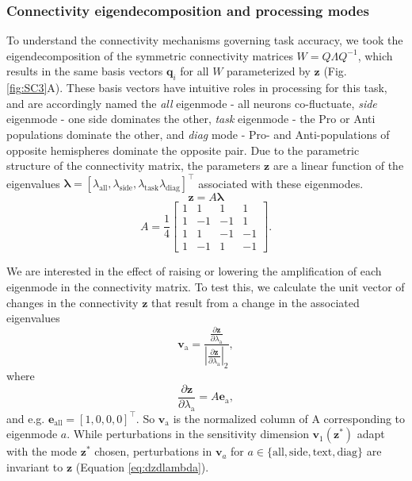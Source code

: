 \documentclass[11pt]{article}
\begin{document}
\subsubsection{Connectivity eigendecomposition and processing modes} \label{methods_sc_eig}
To understand the connectivity mechanisms governing task accuracy, we took the eigendecomposition of the symmetric connectivity matrices $W = Q\Lambda Q^{-1}$, which results in the same basis vectors $\mathbf{q}_i$ for all $W$ parameterized by $\mathbf{z}$ (Fig. \ref{fig:SC3}A). 
These basis vectors have intuitive roles in processing for this task, and are accordingly named the \textit{all} eigenmode - all neurons co-fluctuate, \textit{side} eigenmode - one side dominates the other, \textit{task} eigenmode - the Pro or Anti populations dominate the other, and \textit{diag} mode - Pro- and Anti-populations of opposite hemispheres dominate the opposite pair. 
Due to the parametric structure of the connectivity matrix, the parameters $\mathbf{z}$ are a linear function of the eigenvalues $\bm{\lambda} = [\lambda_{\text{all}}, \lambda_{\text{side}}, \lambda_{\text{task}}\lambda_{\text{diag}}]^\top$ associated with these eigenmodes.
\begin{equation}
\mathbf{z} = A\bm{\lambda}
\end{equation}
\begin{equation}
A = \frac{1}{4} \begin{bmatrix} 1 & 1 & 1 & 1 \\ 1 & -1 & -1 & 1 \\ 1 & 1 & -1 & -1 \\ 1 & -1 & 1 & -1 \end{bmatrix}.
\end{equation}

We are interested in the effect of raising or lowering the amplification of each eigenmode in the connectivity matrix.
To test this, we calculate the unit vector of changes in the connectivity $\mathbf{z}$ that result from a change in the associated eigenvalues
\begin{equation}
\mathbf{v}_{\text{a}} = \frac{\frac{\partial \mathbf{z}}{\partial \lambda_{\text{a}}}}{|\frac{\partial \mathbf{z}}{\partial \lambda_{\text{a}}}|_2},
\end{equation}
where
\begin{equation} \label{eq:dzdlambda}
\frac{\partial \mathbf{z}}{\partial \lambda_{\text{a}}} = A\mathbf{e}_{\text{a}},
\end{equation}
and e.g. $\mathbf{e}_{\text{all}} = [1, 0, 0, 0]^\top$.
So $\mathbf{v}_{\text{a}}$ is the normalized column of A corresponding to eigenmode $a$.
While perturbations in the sensitivity dimension $\mathbf{v}_1(\mathbf{z}^*)$ adapt with the mode $\mathbf{z}^*$ chosen, perturbations in $\mathbf{v}_a$ for $a \in \{\text{all}, \text{side}, \text{text}, \text{diag}\}$ are invariant to $\mathbf{z}$ (Equation \ref{eq:dzdlambda}).
\end{document}
